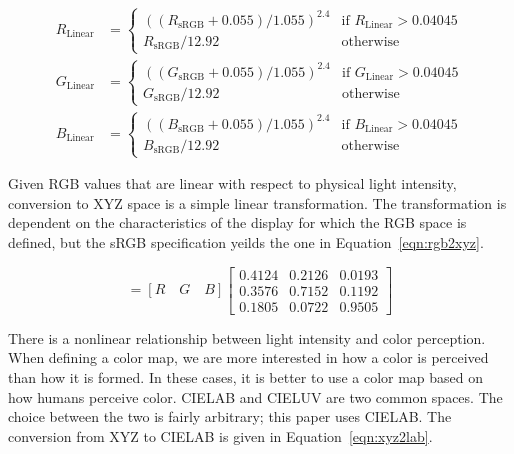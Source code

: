 \documentclass[review,journal]{vgtc}         %
\newcommand{\RGB}{RGB\xspace}
\newcommand{\XYZ}{XYZ\xspace}
\newcommand{\Lab}{CIELAB\xspace}
\newcommand{\Luv}{CIELUV\xspace}
\begin{document}
\begin{equation}
  \begin{split}
    R_\mathrm{Linear} &=
    \begin{cases}
      \left((R_\mathrm{sRGB}+0.055)/1.055\right)^{2.4}
      & \text{if $R_\mathrm{Linear} > 0.04045$} \\
      R_{\mathrm{sRGB}}/12.92 & \text{otherwise}
    \end{cases} \\
    G_\mathrm{Linear} &=
    \begin{cases}
      \left((G_\mathrm{sRGB}+0.055)/1.055\right)^{2.4}
      & \text{if $G_\mathrm{Linear} > 0.04045$} \\
      G_{\mathrm{sRGB}}/12.92 & \text{otherwise}
    \end{cases} \\
    B_\mathrm{Linear} &=
    \begin{cases}
      \left((B_\mathrm{sRGB}+0.055)/1.055\right)^{2.4}
      & \text{if $B_\mathrm{Linear} > 0.04045$} \\
      B_{\mathrm{sRGB}}/12.92 & \text{otherwise}
    \end{cases} 
  \end{split}
  \label{eqn:sRGB2linearRGB}
\end{equation}

Given \RGB values that are linear with respect to physical light intensity,
conversion to \XYZ space is a simple linear transformation.  The
transformation is dependent on the characteristics of the display for which
the \RGB space is defined, but the sRGB specification yeilds the one in
Equation~\ref{eqn:rgb2xyz}.

\begin{equation}
  [X \quad Y \quad Z] = [R \quad G \quad B]
  \begin{bmatrix}
    0.4124 & 0.2126 & 0.0193 \\
    0.3576 & 0.7152 & 0.1192 \\
    0.1805 & 0.0722 & 0.9505
  \end{bmatrix}
  \label{eqn:rgb2xyz}
\end{equation}

There is a nonlinear relationship between light intensity and color
perception.  When defining a color map, we are more
interested in how a color is perceived than how it is formed.  In these
cases, it is better to use a color map based on how humans perceive color.
\Lab and \Luv are two common spaces.  The choice between the two is fairly
arbitrary; this paper uses \Lab.  The conversion from \XYZ to \Lab is given
in Equation~\ref{eqn:xyz2lab}.
\end{document}
